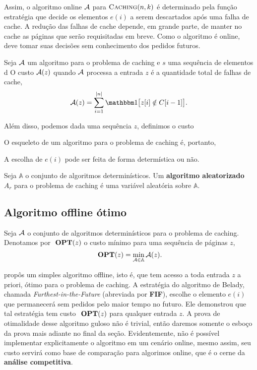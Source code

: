 Assim, o algoritmo online \(\mathcal{A}\) para \(\textsc{Caching}(n,k)\) é determinado pela função estratégia que decide os elementos \(e(i)\) a serem descartados após uma falha de cache. A redução das falhas de cache depende, em grande parte, de manter no cache as páginas que serão requisitadas em breve. Como o algoritmo é online, deve tomar suas decisões sem conhecimento dos pedidos futuros.

\begin{definition}
  Seja \(\mathcal{A}\) um algoritmo para o problema de caching e \(s\) uma sequência de elementos d
  O custo \(\mathcal{A}(z)\) quando \(\mathcal{A}\) processa a entrada \(z\) é a quantidade total de falhas de cache,
  \begin{equation}
    \Acal(z) = \sum_{i=1}^{|n|} \ind{z[i] \notin C[i-1]}.
  \end{equation}
\end{definition}

Além disso, podemos dada uma sequência \(z\), definimos o custo

O esqueleto de um algoritmo para o problema de caching é, portanto,

A escolha de \(e(i)\) pode ser feita de forma determística ou não. 

\begin{definition}
  Seja \(\mathbb{A}\) o conjunto de algoritmos determinísticos. Um \textbf{algoritmo aleatorizado} \(A_r\) para o problema de caching é uma variável aleatória sobre \(\mathbb{A}\). 
\end{definition}

\subsection{Algoritmo offline ótimo}

\begin{definition}
  Seja \(\mathcal{A}\) o conjunto de algoritmos determinísticos para o problema de caching. Denotamos por \(\ \textbf{OPT}(z)\) o custo mínimo para uma sequência de páginas \(z\),
  \begin{equation}
    \ \textbf{OPT}(z) = \min_{\mathcal{A} \in \mathbb{A}} \mathcal{A}(z).
  \end{equation}
\end{definition}

\textcite{Belady66} propôs um simples algoritmo offline, isto é, que tem acesso a toda entrada \(z\) a priori, ótimo para o problema de caching. A estratégia do algoritmo de Belady, chamada \textit{Furthest-in-the-Future} (abreviada por \textbf{FIF}), escolhe o elemento \(e(i)\) que permanecerá sem pedidos pelo maior tempo no futuro. Ele demonstrou que tal estratégia tem custo \(\ \textbf{OPT}(z)\) para qualquer entrada \(z\). A prova de otimalidade desse algoritmo guloso não é trivial, então daremos somente o esboço da prova mais adiante no final da seção. Evidentemente, não é possível implementar explicitamente o algoritmo em um cenário online, mesmo assim, seu custo servirá como base de comparação para algorimos online, que é o cerne da \textbf{análise competitiva}.


